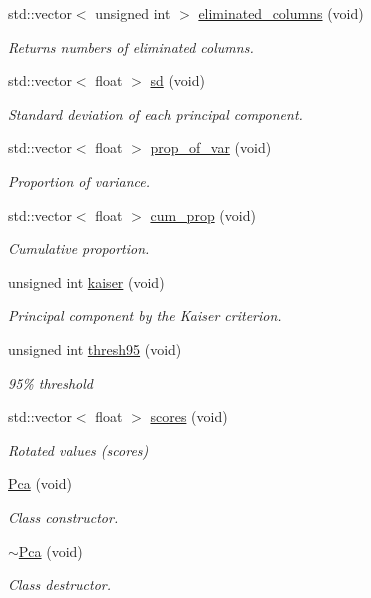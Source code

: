 \begin{DoxyCompactItemize}
std\+::vector$<$ unsigned int $>$ \hyperlink{classPca_a846bfe6726f3c846a50ec045567d3861}{eliminated\+\_\+columns} (void)
\begin{DoxyCompactList}\small\item\em Returns numbers of eliminated columns. \end{DoxyCompactList}\item 
std\+::vector$<$ float $>$ \hyperlink{classPca_a687a02cd667152bc5ce9de328519799b}{sd} (void)
\begin{DoxyCompactList}\small\item\em Standard deviation of each principal component. \end{DoxyCompactList}\item 
std\+::vector$<$ float $>$ \hyperlink{classPca_a70f5508f41d2d61464fe8ce21f48dc89}{prop\+\_\+of\+\_\+var} (void)
\begin{DoxyCompactList}\small\item\em Proportion of variance. \end{DoxyCompactList}\item 
std\+::vector$<$ float $>$ \hyperlink{classPca_a08407cc5449d7461b1b1b828c464e80a}{cum\+\_\+prop} (void)
\begin{DoxyCompactList}\small\item\em Cumulative proportion. \end{DoxyCompactList}\item 
unsigned int \hyperlink{classPca_a6c1fbe858a4cde8aa34cab8c19c84941}{kaiser} (void)
\begin{DoxyCompactList}\small\item\em Principal component by the Kaiser criterion. \end{DoxyCompactList}\item 
unsigned int \hyperlink{classPca_a0ff511b4a419122a8ac6db494289ae2a}{thresh95} (void)
\begin{DoxyCompactList}\small\item\em 95\% threshold \end{DoxyCompactList}\item 
std\+::vector$<$ float $>$ \hyperlink{classPca_a469f69a53d76c2f7ad26e28e969bd09c}{scores} (void)
\begin{DoxyCompactList}\small\item\em Rotated values (scores) \end{DoxyCompactList}\item 
\hyperlink{classPca_ac8f42fb6ce69fb1a3a85c99d6b49204c}{Pca} (void)
\begin{DoxyCompactList}\small\item\em Class constructor. \end{DoxyCompactList}\item 
\hyperlink{classPca_a900858e8760079d51bff8fd267f551ce}{$\sim$\+Pca} (void)
\begin{DoxyCompactList}\small\item\em Class destructor. \end{DoxyCompactList}\end{DoxyCompactItemize}


